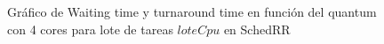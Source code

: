 \begin{figure}[H]
\hfill
{}
\hfill
{}
\hfill
\caption{Gráfico de Waiting time y turnaround time en función del quantum con 4 cores para lote de tareas $loteCpu$ en SchedRR}
\end{figure}

